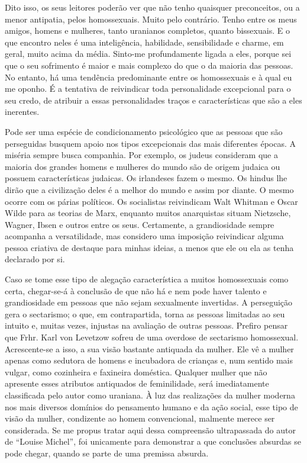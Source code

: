 Dito isso, os seus leitores poderão ver que não tenho quaisquer
preconceitos, ou a menor antipatia, pelos homossexuais. Muito pelo
contrário. Tenho entre os meus amigos, homens e mulheres, tanto
uranianos completos, quanto bissexuais. E o que encontro neles é uma
inteligência, habilidade, sensibilidade e charme, em geral, muito acima
da média. Sinto-me profundamente ligada a eles, porque sei que o seu
sofrimento é maior e mais complexo do que o da maioria das pessoas. No
entanto, há uma tendência predominante entre os homossexuais e à qual eu
me oponho. É a tentativa de reivindicar toda personalidade excepcional
para o seu credo, de atribuir a essas personalidades traços e
características que são a eles inerentes.

Pode ser uma espécie de condicionamento psicológico que as pessoas que
são perseguidas busquem apoio nos tipos excepcionais das mais diferentes
épocas. A miséria sempre busca companhia. Por exemplo, os judeus
consideram que a maioria dos grandes homens e mulheres do mundo são de
origem judaica ou possuem características judaicas. Os irlandeses fazem
o mesmo. Os hindus lhe dirão que a civilização deles é a melhor do mundo
e assim por diante. O mesmo ocorre com os párias políticos. Os
socialistas reivindicam Walt Whitman e Oscar Wilde para as teorias de
Marx, enquanto muitos anarquistas situam Nietzsche, Wagner, Ibsen e
outros entre os seus. Certamente, a grandiosidade sempre acompanha a
versatilidade, mas considero uma imposição reivindicar alguma pessoa
criativa de destaque para minhas ideias, a menos que ele ou ela as tenha
declarado por si.

Caso se tome esse tipo de alegação característica a muitos homossexuais
como certa, chegar-se-á à conclusão de que não há e nem pode haver
talento e grandiosidade em pessoas que não sejam sexualmente invertidas.
A perseguição gera o sectarismo; o que, em contrapartida, torna as
pessoas limitadas ao seu intuito e, muitas vezes, injustas na avaliação
de outras pessoas. Prefiro pensar que Frhr. Karl von Levetzow sofreu de
uma overdose de sectarismo homossexual. Acrescente-se a isso, a sua
visão bastante antiquada da mulher. Ele vê a mulher apenas como sedutora
de homens e incubadora de crianças e, num sentido mais vulgar, como
cozinheira e faxineira doméstica. Qualquer mulher que não apresente
esses atributos antiquados de feminilidade, será imediatamente
classificada pelo autor como uraniana. À luz das realizações da mulher
moderna nos mais diversos domínios do pensamento humano e da ação
social, esse tipo de visão da mulher, condizente ao homem convencional,
malmente merece ser considerada. Se me propus tratar aqui dessa
compreensão ultrapassada do autor de ``Louise Michel'', foi unicamente
para demonstrar a que conclusões absurdas se pode chegar, quando se
parte de uma premissa absurda.

